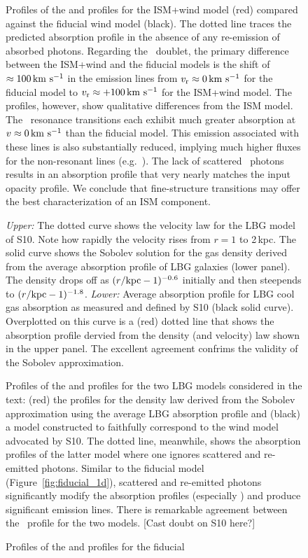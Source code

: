 \documentclass[12pt,preprint]{aastex}
\begin{document}
\begin{figure}
\caption{
Profiles of the  and  profiles for the ISM+wind
model (red) compared against the fiducial wind model (black). 
The dotted line traces the predicted absorption profile in the absence
of any re-emission of absorbed photons.
Regarding the ~doublet, the primary difference between the
ISM+wind and the fiducial models is the shift of $\approx 100 \, {\rm km~s^{-1}}$
in the emission lines from $v_{\rm r} \approx 0 \, {\rm km~s^{-1}}$ for the fiducial
model to $v_{\rm r} \approx +100\, {\rm km~s^{-1}}$ for the ISM+wind model. 
The  profiles, however, show qualitative differences from
the ISM model.  The \feiid\ resonance transitions each exhibit much
greater absorption at $v \approx 0 \, {\rm km~s^{-1}}$ than the fiducial model.
This emission associated with these lines is also substantially
reduced, implying much higher fluxes for the non-resonant lines (e.g.\
\feiic).  The lack of scattered \feiia\ photons results in an
absorption profile that very nearly matches the input opacity profile.
We conclude that fine-structure transitions may offer the best
characterization of an ISM component.
}
\label{fig:ISM_spec}
\end{figure}

\begin{figure}
\caption{
{\it Upper:} The dotted curve shows the velocity law for the LBG model
of S10.  Note how rapidly the velocity rises from $r =
1$ to 2\,kpc.  The solid curve shows the Sobolev solution for the gas
density derived from 
the average absorption profile of LBG galaxies (lower panel).
The density drops off as $(r/{\rm kpc}-1)^{-0.6}$ initially and then
steepends to $(r/{\rm kpc}-1)^{-1.8}$.
{\it Lower:} Average absorption profile for LBG cool gas absorption as
measured and defined by S10
(black solid curve).  Overplotted on this curve is a (red) dotted line that
shows the absorption profile dervied from the density (and velocity)
law shown in the upper panel.  The excellent agreement confrims the
validity of the Sobolev approximation.
}
\label{fig:LBG_Sobolev}
\end{figure}

\clearpage

\begin{figure}
\caption{
Profiles of the  and  profiles for the two
LBG models considered in the text: (red) the profiles for the density
law derived from the Sobolev approximation using the average LBG
absorption profile and (black) a model constructed to faithfully
correspond to the wind model advocated by S10.  The dotted line,
meanwhile, shows the absorption profiles of the latter model where one
ignores scattered and re-emitted photons.  Similar to the fiducial
model (Figure~\ref{fig:fiducial_1d}), scattered and re-emitted photons
significantly modify the absorption profiles (especially \ion{Mg}{2})
and produce significant emission lines.  There is remarkable agreement
between the \mgiia\ profile for the two models. [Cast doubt on S10
here?]
}
\label{fig:LBG_spec}
\end{figure}

\begin{figure}
\caption{
Profiles of the  and  profiles for the fiducial
}
\label{fig:LBG_cumul}
\end{figure}
\end{document}
